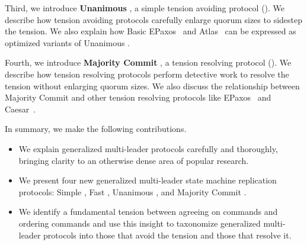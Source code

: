 Third, we introduce \textbf{Unanimous \BPaxos{}}, a simple tension avoiding
protocol (). We describe how tension avoiding
protocols carefully enlarge quorum sizes to sidestep the tension. We also
explain how Basic EPaxos~\cite{moraru2013there} and Atlas~\cite{enes2020state}
can be expressed as optimized variants of Unanimous \BPaxos{}.

Fourth, we introduce \textbf{Majority Commit \BPaxos{}}, a tension resolving
protocol (). We describe how tension resolving
protocols perform detective work to resolve the tension without enlarging
quorum sizes.  We also discuss the relationship between Majority Commit
\BPaxos{} and other tension resolving protocols like
EPaxos~\cite{moraru2013proof} and Caesar~\cite{arun2017speeding}.

In summary, we make the following contributions.
\begin{itemize}
  \item
    We explain generalized multi-leader protocols carefully and thoroughly,
    bringing clarity to an otherwise dense area of popular research.

  \item
    We present four new generalized multi-leader state machine replication
    protocols: Simple \BPaxos{}, Fast \BPaxos{}, Unanimous \BPaxos{}, and
    Majority Commit \BPaxos{}.

  \item
    We identify a fundamental tension between agreeing on commands and ordering
    commands and use this insight to taxonomize generalized multi-leader
    protocols into those that avoid the tension and those that resolve it.
\end{itemize}
